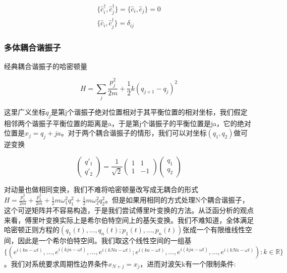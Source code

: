 \begin{equation}
    \begin{split}
        \{\hat{c}_i^\dagger,\hat{c}_j^\dagger\}=\{\hat{c}_i,\hat{c}_j\}=0 \\
        \{\hat{c}_i,\hat{c}_j^\dagger\}=\delta_{ij}
    \end{split}
\end{equation}


\subsubsection{多体耦合谐振子}

经典耦合谐振子的哈密顿量

\begin{equation}
	H=\sum_{j}\frac{p_j^2}{2m}+\frac{1}{2}k(q_{j+1}-q_j)^2
\end{equation}

这里广义坐标$q_j$是第j个谐振子绝对位置相对于其平衡位置的相对坐标，我们假定相邻两个谐振子平衡位置的距离是a，于是第j个谐振子的平衡位置是ja，它的绝对位置是$x_j=q_j+ja$。对于两个耦合谐振子的情形，我们可以对坐标$(q_1,q_2)$做可逆变换

\begin{equation}
    \left(\begin{matrix}
        q'_1 \\ q'_2
    \end{matrix}
    \right) = \frac{1}{\sqrt{2}}\left(
    \begin{matrix}
        1 & 1 \\
        1 & -1 
    \end{matrix} \right) \left(
    \begin{matrix}
        q_1 \\ q_2
    \end{matrix}    
    \right)
\end{equation}

对动量也做相同变换，我们不难将哈密顿量改写成无耦合的形式$H=\frac{p_1^2}{2m}+\frac{p_2^2}{2m}+\frac{1}{2}m\omega_1^2 q_1^2+\frac{1}{2}m\omega_2^2 q_2^2$。但是如果用相同的方式处理N个耦合谐振子，这个可逆矩阵并不容易构造，于是我们尝试傅里叶变换的方法。从泛函分析的观点来看，傅里叶变换实际上是希尔伯特空间上的基矢变换。我们不难知道，全体满足哈密顿正则方程的$(q_1(t),...,q_n(t);p_1(t),...,p_n(t))$张成一个有限维线性空间，因此是一个希尔伯特空间。我们取这个线性空间的一组基$\{(e^{i(ka-\omega t)},...,e^{i(kja-\omega t)},..., e^{i(kNa-\omega t)};e^{i(ka-\omega t)},...,e^{i(kja-\omega t)},...,e^{i(kNa-\omega t)}):k\in\mathbb{R}\}$。我们对系统要求周期性边界条件$x_{N+j}=x_{j}$，进而对波矢k有一个限制条件:

